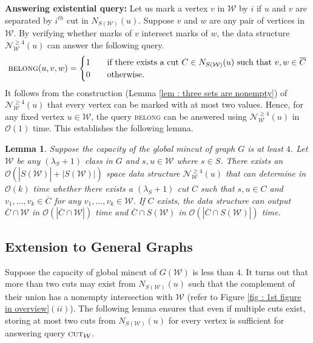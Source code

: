 \documentclass[letterpaper,11pt]{article}
\newtheorem{lemma}{Lemma}[]
\begin{document}
\noindent
\textbf{Answering existential query:} Let us mark a vertex $v$ in ${\mathcal W}$ by $i$ if $u$ and $v$ are separated by $i^{th}$ cut in $N_{S({\mathcal W})}(u)$. Suppose $v$ and $w$ are any pair of vertices in ${\mathcal W}$. By verifying whether marks of $v$ intersect marks of $w$, the data structure ${\mathcal N}^{\ge 4}_{\mathcal W}(u)$ can answer the following query. 
\begin{equation*}
\textsc{belong}(u,v,w)=\begin{cases}
            1 \quad &\text{if there exists a cut $C\in N_{S({\mathcal W})}(u)$ such that $v,w\in \overline{C}$}  \\
            0 \quad &\text{otherwise.}
     \end{cases}
\end{equation*}
It follows from the construction (Lemma \ref{lem : three sets are nonempty}) of ${\mathcal N}^{\ge 4}_{\mathcal W}(u)$ that every vertex can be marked with at most two values. Hence, for any fixed vertex $u\in {\mathcal W}$, the query \textsc{belong} can be answered using ${\mathcal N}^{\ge 4}_{\mathcal W}(u)$ in ${\mathcal O}(1)$ time. This establishes the following lemma.
\begin{lemma} \label{lem : data structure for a single vertex at least 4}
    Suppose the capacity of the global mincut of graph $G$ is at least $4$. Let ${\mathcal W}$ be any $(\lambda_S+1)$ class in $G$ and $s,u\in {\mathcal W}$ where $s\in S$. There exists an $\mathcal{O}(|\overline{S({\mathcal W})}|+|S({\mathcal W})|)$ space data structure ${\mathcal N}^{\ge 4}_{\mathcal W}(u)$ that can determine in ${\mathcal O}(k)$ time whether there exists a $(\lambda_S+1)$ cut $C$ such that $s,u\in C$ and $v_1,\ldots,v_k\in \overline{C}$ for any $v_1,\ldots,v_k \in {\mathcal W}$. If $C$ exists, the data structure can output $\overline{C}\cap {\mathcal{W}}$ in ${\mathcal{O}}(|\overline{C}\cap {\mathcal{W}}|)$ time and $\overline{C}\cap S({\mathcal{W}})$ in ${\mathcal{O}}(|\overline{C}\cap S({\mathcal{W}})|)$ time. 
\end{lemma}
\subsection{Extension to General Graphs} \label{app : extension to general graphs}
Suppose the capacity of global mincut of $G({\mathcal W})$ is less than $4$. It turns out that more than two cuts may exist from $N_{S({\mathcal W})}(u)$ such that the complement of their union has a nonempty intersection with ${\mathcal W}$ (refer to Figure \ref{fig : 1st figure in overview}$(ii)$). The following lemma ensures that even if multiple cuts exist, storing at most two cuts from $N_{S({\mathcal W})}(u)$ for every vertex is sufficient for answering query $\textsc{cut}_{\mathcal W}$. 
\end{document}
